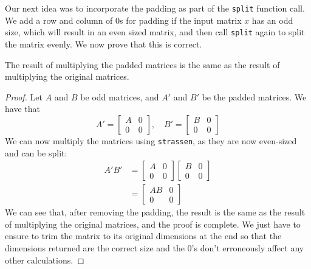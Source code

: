 \documentclass[11pt]{scrartcl}
\theoremstyle{dotlessP}
\theoremstyle{dotlessN}
\theoremstyle{dotN}
\begin{document}
Our next idea was to incorporate the padding as part of the \texttt{split} function call. We add a row and column of 0s for padding if the input matrix $x$ has an odd size, which will result in an even sized matrix, and then call \texttt{split} again to split the matrix evenly. We now prove that this is correct.
\begin{claim}
   The result of multiplying the padded matrices is the same as the result of multiplying the original matrices.
\end{claim}
\begin{proof}
    Let $A$ and $B$ be odd matrices, and $A'$ and $B'$ be the padded matrices. We have that
    \[
    A' = \begin{bmatrix}
        A & 0 \\
        0 & 0
    \end{bmatrix}, \quad B' = \begin{bmatrix}
        B & 0 \\
        0 & 0
    \end{bmatrix}
    \] 
    We can now multiply the matrices using \texttt{strassen}, as they are now even-sized and can be split:
    \begin{align*}
        A'B' &= \begin{bmatrix}
            A & 0 \\
            0 & 0
        \end{bmatrix}\begin{bmatrix}
            B & 0 \\
            0 & 0
        \end{bmatrix} \\
             &= \begin{bmatrix}
                 AB & 0 \\
                 0 & 0
             \end{bmatrix}
    \end{align*}
    We can see that, after removing the padding, the result is the same as the result of multiplying the original
    matrices, and the proof is complete. We just have to ensure to trim the matrix to its original dimensions at the end so that the dimensions returned are the correct size and the 0's don't erroneously affect any other calculations. 
\end{proof}
\end{document}
